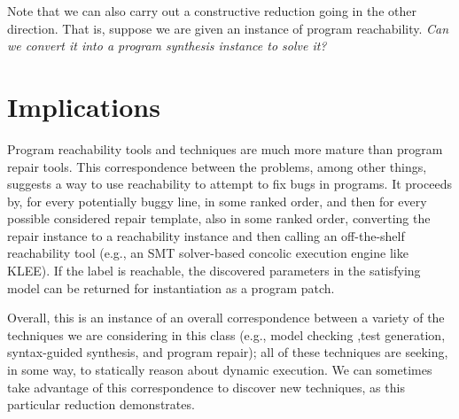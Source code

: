 \documentclass[11pt]{article}
\begin{document}
Note that we can also carry out a constructive reduction going in the other
direction. That is, suppose we are given an instance of program reachability.
\emph{Can we convert it into a program synthesis instance to solve it?}

\section{Implications}

Program reachability tools and techniques are much more mature than program
repair tools. This correspondence between the problems, among other things,
suggests a way to use reachability to attempt to fix bugs in programs. It
proceeds by, for every potentially buggy line, in some ranked order, and then
for every possible considered repair template, also in some ranked order,
converting the repair instance to a reachability instance and then calling an
off-the-shelf reachability tool (e.g., an SMT solver-based concolic execution
engine like KLEE). If the label is reachable, the discovered parameters in the
satisfying model can be returned for instantiation as a program patch.

Overall, this is an instance of an overall correspondence between a variety of
the techniques we are considering in this class (e.g., model checking ,test generation,
syntax-guided synthesis, and program repair); all of these techniques are
seeking, in some way, to statically reason about dynamic execution.  We can
sometimes take advantage of this correspondence to discover new techniques, as
this particular reduction demonstrates. 




\end{document}
